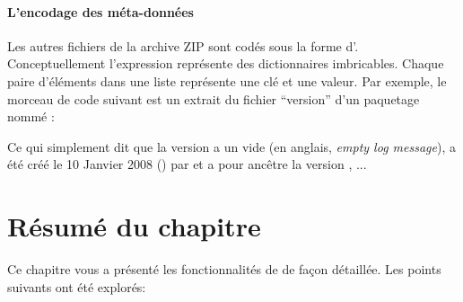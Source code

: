 \documentclass[a4paper,10pt,twoside]{book}
\begin{document}
\paragraph{L'encodage des méta-données}

Les autres fichiers de la archive ZIP sont codés sous la forme
d'.
Conceptuellement l'expression représente des dictionnaires
imbricables. Chaque paire d'éléments dans une liste représente une clé
et une valeur. Par exemple, le morceau de code suivant est un extrait
du fichier ``version'' d'un paquetage nommé :


Ce qui simplement dit que la version  a un  vide (en anglais, \emph{empty log message}), a été
créé le 10 Janvier 2008 () par  et a pour
ancêtre la version , ...





\section{Résumé du chapitre}


Ce chapitre vous a présenté les fonctionnalités de \MC de façon
détaillée.
Les points suivants ont été explorés:
\end{document}
